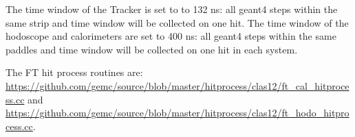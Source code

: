 \noindent The time window  of the Tracker is set to to 132 ns: all geant4 steps within the same strip and time window will be collected on one hit.
The time window of the hodoscope and calorimeters are set to 400 ns: all geant4 steps within the same paddles and time window
will be collected on one hit in each system.

The FT hit process routines are: \url{https://github.com/gemc/source/blob/master/hitprocess/clas12/ft_cal_hitprocess.cc} and
\url{https://github.com/gemc/source/blob/master/hitprocess/clas12/ft_hodo_hitprocess.cc}.
